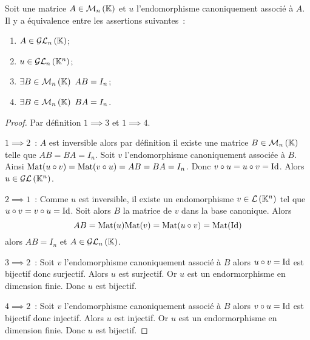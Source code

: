 \begin{theo}
  Soit une matrice \(A \in \mathcal{M}_{n}\left(\mathbb{K}\right)\) et \(u\) l'endomorphisme canoniquement 
  associé à \(A\). Il y a équivalence entre les assertions suivantes~:
  \begin{enumerate}
    \item \(A \in \mathcal{GL}_{n}\left(\mathbb{K}\right)\);
    \item \(u \in \mathcal{GL}_{n}\left(\mathbb{K}^n\right)\);
    \item \(\exists B \in \Mn{n}{\K} \ AB=I_n\);
    \item \(\exists B \in \Mn{n}{\K} \ BA=I_n\).
  \end{enumerate}
\end{theo}
\begin{proof}
  Par définition \(1 \implies 3\) et \(1 \implies 4\). 

  \(1 \implies 2\)~: \(A\) est inversible alors par définition il existe une 
  matrice \(B \in \mathcal{M}_{n}\left(\mathbb{K}\right)\) telle que \(AB=BA=I_n\). Soit \(v\) 
  l'endomorphisme canoniquement associée à \(B\). Ainsi \(\mathrm{Mat}(u \circ v) = 
  \mathrm{Mat}(v \circ u) =AB=BA=I_n\). Donc \(v \circ u=u \circ v=\operatorname{Id}\). Alors \(u \in 
  \mathcal{GL}\left(\mathbb{K}^n\right)\).

  \(2 \implies 1\)~: Comme \(u\) est inversible, il existe un endomorphisme \(v 
  \in \mathcal{L}\left(\mathbb{K}^n\right)\) tel que \(u \circ v=v \circ u=\operatorname{Id}\). Soit alors \(B\) la 
  matrice de \(v\) dans la base canonique. Alors
  \begin{equation}
    AB=\mathrm{Mat}(u) \mathrm{Mat}(v)=\mathrm{Mat}(u \circ v)=\mathrm{Mat}(\operatorname{Id})
  \end{equation}
  alors \(AB=I_n\) et \(A \in \mathcal{GL}_{n}\left(\mathbb{K}\right)\).

  \(3 \implies 2\)~: Soit \(v\) l'endomorphisme canoniquement associé à \(B\) 
  alors \(u\circ v=\operatorname{Id}\) est bijectif donc surjectif. Alors \(u\) est surjectif. 
  Or \(u\) est un endormorphisme en dimension finie. Donc \(u\) est bijectif.

  \(4 \implies 2\)~: Soit \(v\) l'endomorphisme canoniquement associé à \(B\) 
  alors \(v\circ u=\operatorname{Id}\) est bijectif donc injectif. Alors \(u\) est injectif. 
  Or \(u\) est un endormorphisme en dimension finie. Donc \(u\) est bijectif.
\end{proof}

